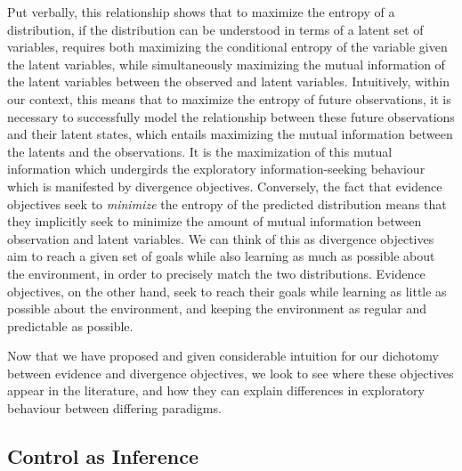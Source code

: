 Put verbally, this relationship shows that to maximize the entropy of a distribution, if the distribution can be understood in terms of a latent set of variables, requires both maximizing the conditional entropy of the variable given the latent variables, while simultaneously maximizing the mutual information of the latent variables between the observed and latent variables. Intuitively, within our context, this means that to maximize the entropy of future observations, it is necessary to successfully model the relationship between these future observations and their latent states, which entails maximizing the mutual information between the latents and the observations. It is the maximization of this mutual information which undergirds the exploratory information-seeking behaviour which is manifested by divergence objectives. Conversely, the fact that evidence objectives seek to \emph{minimize} the entropy of the predicted distribution means that they implicitly seek to minimize the amount of mutual information between observation and latent variables. We can think of this as divergence objectives aim to reach a given set of goals while also learning as much as possible about the environment, in order to precisely match the two distributions. Evidence objectives, on the other hand, seek to reach their goals while learning as little as possible about the environment, and keeping the environment as regular and predictable as possible. 

Now that we have proposed and given considerable intuition for our dichotomy between evidence and divergence objectives, we look to see where these objectives appear in the literature, and how they can explain differences in exploratory behaviour between differing paradigms.

\subsection{Control as Inference}


